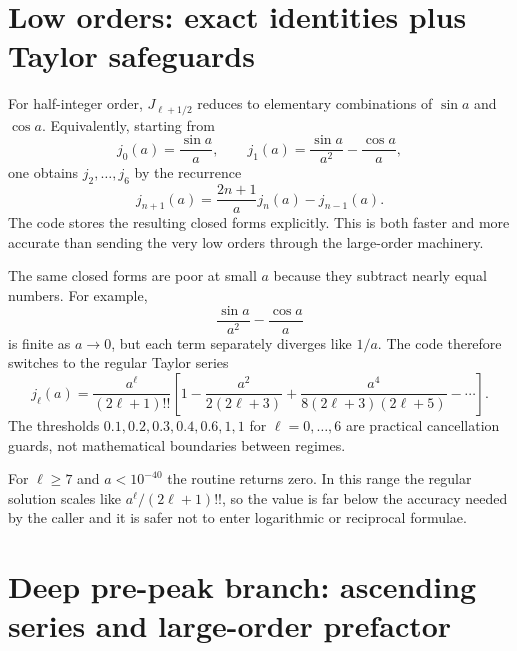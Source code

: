 \documentclass[11pt,a4paper]{article}
\begin{document}
\section{Low orders: exact identities plus Taylor safeguards}

For half-integer order, $J_{\ell+1/2}$ reduces to elementary combinations of $\sin a$ and $\cos a$.  Equivalently, starting from
\begin{equation}
  j_0(a)=\frac{\sin a}{a},\qquad
  j_1(a)=\frac{\sin a}{a^2}-\frac{\cos a}{a},
\end{equation}
one obtains $j_2,\ldots,j_6$ by the recurrence
\begin{equation}
  j_{n+1}(a)=\frac{2n+1}{a}j_n(a)-j_{n-1}(a).
\end{equation}
The code stores the resulting closed forms explicitly.  This is both faster and more accurate than sending the very low orders through the large-order machinery.

The same closed forms are poor at small $a$ because they subtract nearly equal numbers.  For example,
\begin{equation}
  \frac{\sin a}{a^2}-\frac{\cos a}{a}
\end{equation}
is finite as $a\to0$, but each term separately diverges like $1/a$.  The code therefore switches to the regular Taylor series
\begin{equation}
  j_\ell(a)=\frac{a^\ell}{(2\ell+1)!!}
  \left[1-\frac{a^2}{2(2\ell+3)}
  +\frac{a^4}{8(2\ell+3)(2\ell+5)}-\cdots\right].
\end{equation}
The thresholds $0.1,0.2,0.3,0.4,0.6,1,1$ for $\ell=0,\ldots,6$ are practical cancellation guards, not mathematical boundaries between regimes.

For $\ell\ge7$ and $a<10^{-40}$ the routine returns zero.  In this range the regular solution scales like $a^\ell/(2\ell+1)!!$, so the value is far below the accuracy needed by the caller and it is safer not to enter logarithmic or reciprocal formulae.

\section{Deep pre-peak branch: ascending series and large-order prefactor}
\end{document}
